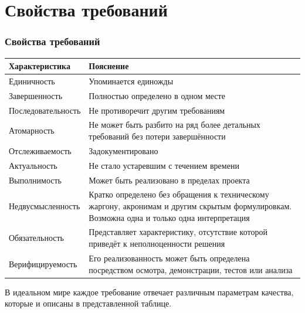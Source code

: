 \documentclass{../industrial-development}
\begin{document}
\section{Свойства требований}
\begin{frame} \frametitle{Свойства требований}
  
	\begin{table}[h]
\begin{center}
\begin{tabular}{|p{3cm}|p{}|}
\hline
\tiny \textbf{Характеристика}   & \tiny \textbf{Пояснение} \\
\hline
\tiny  Единичность & \tiny Упоминается единожды \\
\hline
\tiny Завершенность & \tiny Полностью определено в одном месте \\
\hline
\tiny Последовательность & \tiny Не противоречит другим требованиям \\
\hline
\tiny  Атомарность & \tiny Не может быть разбито на ряд более детальных требований без потери завершённости\\
\hline
\tiny  Отслеживаемость & \tiny Задокументировано \\
\hline
\tiny Актуальность  & \tiny Не стало устаревшим с течением времени \\
\hline
\tiny  Выполнимость & \tiny Может быть реализовано в пределах проекта \\
\hline
\tiny  Недвусмысленность & \tiny Кратко определено без обращения к техническому жаргону, акронимам и другим скрытым формулировкам. Возможна одна и только одна интерпретация \\
\hline
\tiny Обязательность & \tiny Представляет характеристику, отсутствие которой приведёт к неполноценности решения \\
\hline
\tiny Верифицируемость & \tiny Его реализованность может быть определена посредством осмотра, демонстрации, тестов или анализа \\
\hline



\end{tabular}
\end{center}
\end{table}
	
	
\end{frame}

\lecturenotes

В идеальном мире каждое требование отвечает различным параметрам качества, которые и описаны в представленной таблице.
\end{document}
